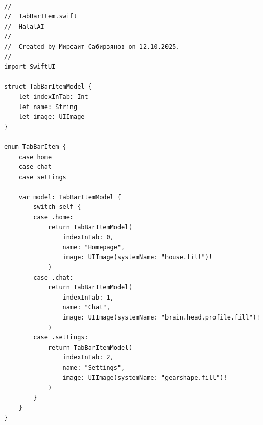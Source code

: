 \begin{lstlisting}[basicstyle=\tiny\ttfamily,breaklines=true]

//
//  TabBarItem.swift
//  HalalAI
//
//  Created by Мирсаит Сабирзянов on 12.10.2025.
//
import SwiftUI

struct TabBarItemModel {
    let indexInTab: Int
    let name: String
    let image: UIImage
}

enum TabBarItem {
    case home
    case chat
    case settings

    var model: TabBarItemModel {
        switch self {
        case .home:
            return TabBarItemModel(
                indexInTab: 0,
                name: "Homepage",
                image: UIImage(systemName: "house.fill")!
            )
        case .chat:
            return TabBarItemModel(
                indexInTab: 1,
                name: "Chat",
                image: UIImage(systemName: "brain.head.profile.fill")!
            )
        case .settings:
            return TabBarItemModel(
                indexInTab: 2,
                name: "Settings",
                image: UIImage(systemName: "gearshape.fill")!
            )
        }
    }
}
\end{lstlisting}


